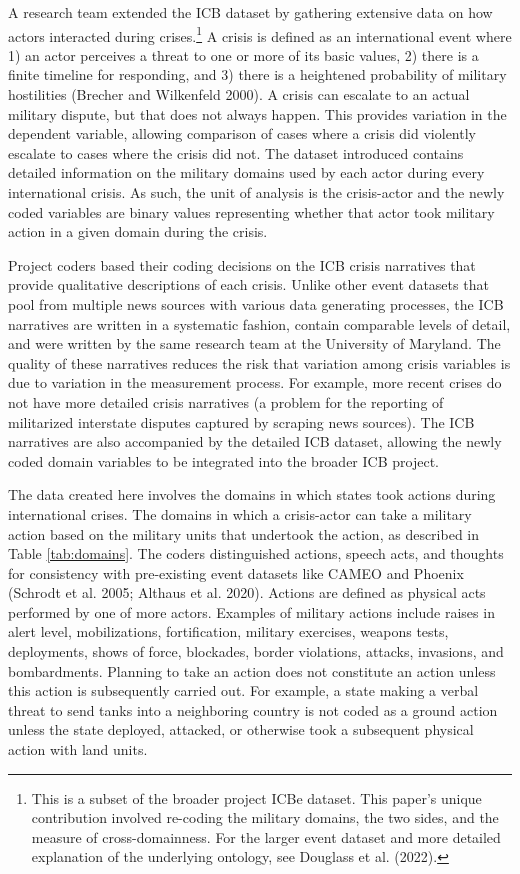 \documentclass[
]{article}
\begin{document}
A research team extended the ICB dataset by gathering extensive data on how actors interacted during crises.\footnote{This is a subset of the broader project ICBe dataset. This paper's unique contribution involved re-coding the military domains, the two sides, and the measure of cross-domainness. For the larger event dataset and more detailed explanation of the underlying ontology, see Douglass et al. (2022).} A crisis is defined as an international event where 1) an actor perceives a threat to one or more of its basic values, 2) there is a finite timeline for responding, and 3) there is a heightened probability of military hostilities (Brecher and Wilkenfeld 2000). A crisis can escalate to an actual military dispute, but that does not always happen. This provides variation in the dependent variable, allowing comparison of cases where a crisis did violently escalate to cases where the crisis did not. The dataset introduced contains detailed information on the military domains used by each actor during every international crisis. As such, the unit of analysis is the crisis-actor and the newly coded variables are binary values representing whether that actor took military action in a given domain during the crisis.

Project coders based their coding decisions on the ICB crisis narratives that provide qualitative descriptions of each crisis. Unlike other event datasets that pool from multiple news sources with various data generating processes, the ICB narratives are written in a systematic fashion, contain comparable levels of detail, and were written by the same research team at the University of Maryland. The quality of these narratives reduces the risk that variation among crisis variables is due to variation in the measurement process. For example, more recent crises do not have more detailed crisis narratives (a problem for the reporting of militarized interstate disputes captured by scraping news sources). The ICB narratives are also accompanied by the detailed ICB dataset, allowing the newly coded domain variables to be integrated into the broader ICB project.

The data created here involves the domains in which states took actions during international crises. The domains in which a crisis-actor can take a military action based on the military units that undertook the action, as described in Table \ref{tab:domains}. The coders distinguished actions, speech acts, and thoughts for consistency with pre-existing event datasets like CAMEO and Phoenix (Schrodt et al. 2005; Althaus et al. 2020). Actions are defined as physical acts performed by one of more actors. Examples of military actions include raises in alert level, mobilizations, fortification, military exercises, weapons tests, deployments, shows of force, blockades, border violations, attacks, invasions, and bombardments. Planning to take an action does not constitute an action unless this action is subsequently carried out. For example, a state making a verbal threat to send tanks into a neighboring country is not coded as a ground action unless the state deployed, attacked, or otherwise took a subsequent physical action with land units.
\end{document}
